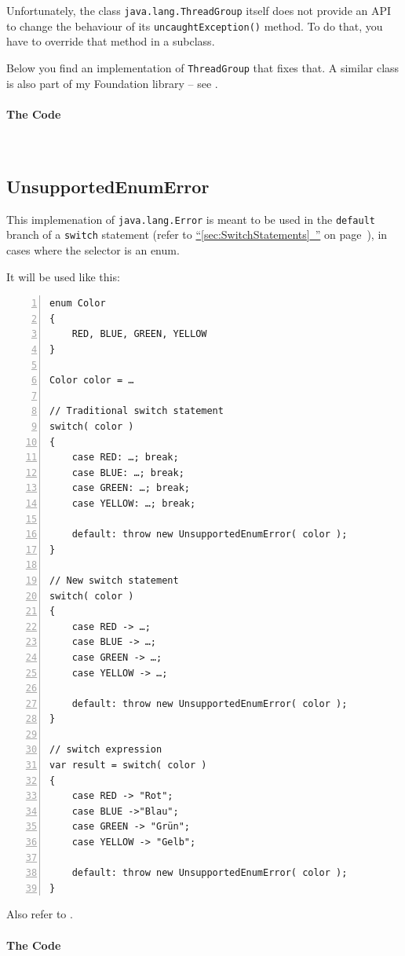 \documentclass[11pt,a4paper, titlepage, parskip=half, headsepline, footsepline, cleardoublepage=current, headheight=1cm]{scrbook}
\newcommand*{\tqfullvref}[1]{\hyperref[{#1}]{“\ref*{#1}~\nameref*{#1}”} on page~\pageref{#1}}
\begin{document}
Unfortunately, the class \lstinline|java.lang.ThreadGroup| itself does not provide an API to change the behaviour of its \lstinline|uncaughtException()| method. To do that, you have to override that method in a subclass.

Below you find an implementation of \lstinline|ThreadGroup| that fixes that. A similar class is also part of my Foundation library – see \autocite{TQUADRAT_ORG_FOUNDATION_BASE, TQUADRAT_ORG_FOUNDATION_THREADGROUP}.

\paragraph{The Code} \


\subsection{UnsupportedEnumError}\label{sec:UnsupportedEnumError}
This implemenation of \lstinline|java.lang.Error| is meant to be used in the \lstinline|default| branch of a \lstinline|switch| statement (refer to \tqfullvref{sec:SwitchStatements}), in cases where the selector is an enum.

It will be used like this:
\begin{lstlisting}[numbers=left]
enum Color
{
    RED, BLUE, GREEN, YELLOW
}

Color color = …    

// Traditional switch statement
switch( color )
{
    case RED: …; break;
    case BLUE: …; break;
    case GREEN: …; break;
    case YELLOW: …; break;

    default: throw new UnsupportedEnumError( color );
}

// New switch statement
switch( color )
{
    case RED -> …;
    case BLUE -> …;
    case GREEN -> …;
    case YELLOW -> …;

    default: throw new UnsupportedEnumError( color );
}

// switch expression
var result = switch( color )
{
    case RED -> "Rot";
    case BLUE ->"Blau";
    case GREEN -> "Grün";
    case YELLOW -> "Gelb";

    default: throw new UnsupportedEnumError( color );
}
\end{lstlisting}

Also refer to \autocite{TQUADRAT_ORG_FOUNDATION_UNSUPPORTEDENUMERROR}.

\paragraph{The Code} \


\listoftables

\lstlistoflistings

\begin{FlushLeft}
\printbibliography
\end{FlushLeft}

\printindex
\end{document}
